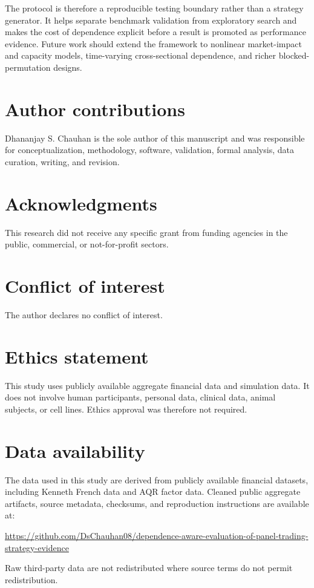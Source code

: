 \documentclass[12pt,a4paper]{article}
\newif\ifblinded
\begin{document}
The protocol is therefore a reproducible testing boundary rather than a
strategy generator.  It helps separate benchmark validation from
exploratory search and makes the cost of dependence explicit before a
result is promoted as performance evidence.  Future work should extend the framework to
nonlinear market-impact and capacity models, time-varying
cross-sectional dependence, and richer blocked-permutation designs.

\section*{Author contributions}

\ifblinded
The author was responsible for conceptualization, methodology, software,
validation, formal analysis, data curation, writing, and revision.
\else
Dhananjay S. Chauhan is the sole author of this manuscript and was
responsible for conceptualization, methodology, software, validation,
formal analysis, data curation, writing, and revision.
\fi

\section*{Acknowledgments}

This research did not receive any specific grant from funding agencies in
the public, commercial, or not-for-profit sectors.

\section*{Conflict of interest}

The author declares no conflict of interest.

\section*{Ethics statement}

This study uses publicly available aggregate financial data and
simulation data. It does not involve human participants, personal data,
clinical data, animal subjects, or cell lines. Ethics approval was
therefore not required.

\section*{Data availability}

The data used in this study are derived from publicly available financial
datasets, including Kenneth French data and AQR factor data. Cleaned
public aggregate artifacts, source metadata, checksums, and reproduction
instructions are available at:
\ifblinded
{\scriptsize\noindent Repository link omitted from the review manuscript
to preserve double-blind anonymity; it is supplied in the separate title
page and submission metadata.\par}
\else
{\scriptsize\noindent
\url{https://github.com/DsChauhan08/dependence-aware-evaluation-of-panel-trading-strategy-evidence}\par}
\fi
Raw third-party data are not redistributed where source terms do not
permit redistribution.
\end{document}
